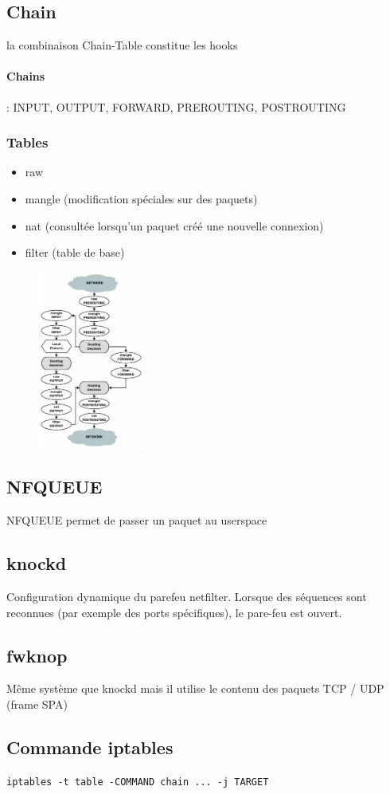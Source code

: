 \documentclass[resume]{subfiles}
\begin{document}
\subsection{Chain}
la combinaison Chain-Table constitue les hooks
\paragraph{Chains} : INPUT, OUTPUT, FORWARD, PREROUTING, POSTROUTING
\subsubsection{Tables}
\begin{itemize}
\item raw
\item mangle (modification spéciales sur des paquets)
\item nat (consultée lorsqu'un paquet créé une nouvelle connexion)
\item filter (table de base)
\end{itemize}
\begin{figure}[H]
\centering
\includegraphics[width=3.50cm]{img_8.png}
\end{figure}
\subsection{NFQUEUE}
NFQUEUE permet de passer un paquet au userspace
\subsection{knockd}
Configuration dynamique du parefeu netfilter. Lorsque des séquences sont reconnues (par exemple des ports spécifiques), le pare-feu est ouvert.
\subsection{fwknop}
Même système que knockd mais il utilise le contenu des paquets TCP / UDP (frame SPA)

\subsection{Commande iptables}
\begin{center}
\verb!iptables -t table -COMMAND chain ... -j TARGET!
\end{center}
\end{document}
